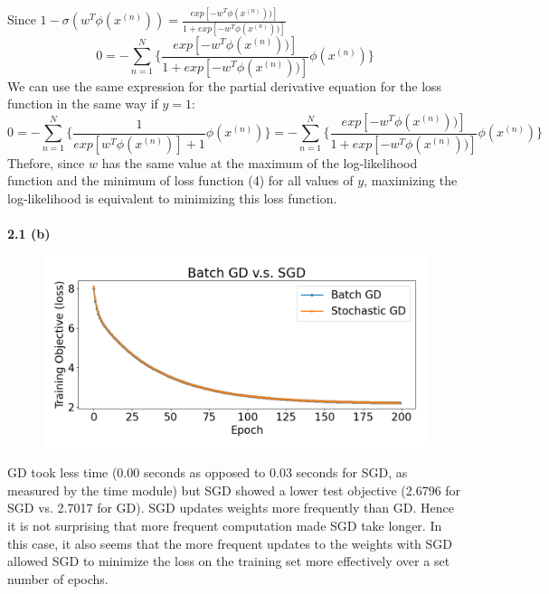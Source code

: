 \documentclass[12 pt]{article}        	%
\begin{document}
Since $ 1 - \sigma(w^T \phi(x^{(n)})) = \frac{ exp [ - w^T \phi(x^{(n)})) ] } { 1 + exp[ - w^T \phi(x^{(n)})) ] }  $
\begin{displaymath}
0 = - \sum_{n=1}^{N} \{
    \frac{ exp [ - w^T \phi(x^{(n)})) ] } { 1 + exp[ - w^T \phi(x^{(n)})) ] } 
    \phi(x^{(n)})
  \}
\end{displaymath}
We can use the same expression for the partial derivative equation for the loss function in the same way 
if $ y = 1 $: 
\begin{displaymath}
  0 = - \sum_{n=1}^{N} \{
    \frac{1} {exp [w^T \phi(x^{(n)})] + 1 } \phi(x^{(n)}) 
  \}
  =
  - \sum_{n=1}^{N} \{
    \frac{ exp [ - w^T \phi(x^{(n)})) ] } { 1 + exp[ - w^T \phi(x^{(n)})) ] } 
    \phi(x^{(n)})
  \}
\end{displaymath}
Thefore, since $ w $ has the same value at the maximum of the log-likelihood function 
and the minimum of loss function (4) for all values of $ y $, maximizing the log-likelihood 
is equivalent to minimizing this loss function. \\ \\

\textbf{2.1 (b)} 

\begin{figure}[h!]
  \includegraphics[width=\linewidth]{gd_vs_sgd.png}
\end{figure}

GD took less time (0.00 seconds as opposed to 0.03 seconds for SGD, as measured by the time module)
but SGD showed a lower test objective (2.6796 for SGD vs. 2.7017 for GD). 
SGD updates weights more frequently than GD. Hence it is not surprising
that more frequent computation made SGD take longer. 
In this case, it also seems that the more frequent updates to the weights with SGD 
allowed SGD to minimize the loss on the training set more effectively over a set number
of epochs. \\ \\ \\ \\ \\ \\ \\ \\
\end{document}
